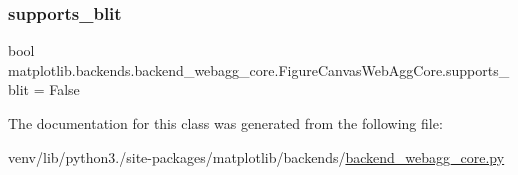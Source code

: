 \subsubsection{\texorpdfstring{supports\+\_\+blit}{supports\_blit}}
{\footnotesize\ttfamily bool matplotlib.\+backends.\+backend\+\_\+webagg\+\_\+core.\+Figure\+Canvas\+Web\+Agg\+Core.\+supports\+\_\+blit = False\hspace{0.3cm}{\ttfamily [static]}}



The documentation for this class was generated from the following file\+:\begin{DoxyCompactItemize}
\item 
venv/lib/python3./site-\/packages/matplotlib/backends/\hyperlink{backend__webagg__core_8py}{backend\+\_\+webagg\+\_\+core.\+py}\end{DoxyCompactItemize}
